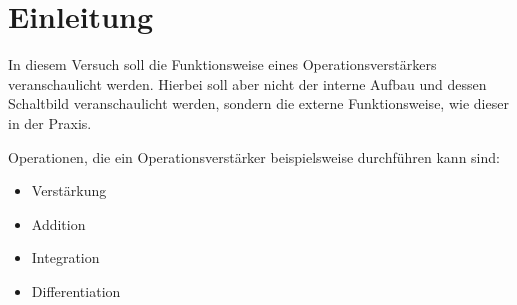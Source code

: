 \part{Einleitung}
In diesem Versuch soll die Funktionsweise eines Operationsverstärkers
veranschaulicht werden. Hierbei soll aber nicht der interne Aufbau und dessen 
Schaltbild veranschaulicht werden, sondern die externe Funktionsweise, wie 
dieser in der Praxis.

Operationen, die ein Operationsverstärker beispielsweise durchführen kann sind:
\begin{itemize}
	\item Verstärkung
	\item Addition
	\item Integration
	\item Differentiation
\end{itemize}